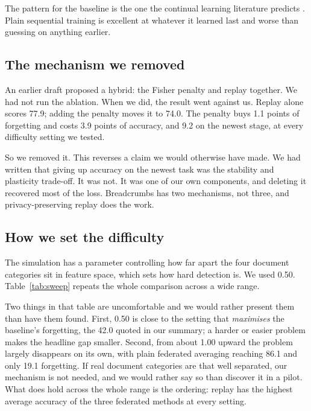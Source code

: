 \documentclass[11pt,a4paper]{article}
\begin{document}
The pattern for the baseline is the one the continual learning literature
predicts \citep{delange2022survey}. Plain sequential training is excellent at
whatever it learned last and worse than guessing on anything earlier.

\subsection{The mechanism we removed}
\label{sec:removed}

An earlier draft proposed a hybrid: the Fisher penalty and replay together. We
had not run the ablation. When we did, the result went against us. Replay alone
scores 77.9; adding the penalty moves it to 74.0. The penalty buys 1.1 points of
forgetting and costs 3.9 points of accuracy, and 9.2 on the newest stage, at
every difficulty setting we tested.

So we removed it. This reverses a claim we would otherwise have made. We had
written that giving up accuracy on the newest task was the stability and
plasticity trade-off. It was not. It was one of our own components, and deleting
it recovered most of the loss. Breadcrumbs has two mechanisms, not three, and
privacy-preserving replay does the work.

\subsection{How we set the difficulty}
\label{sec:difficulty}

The simulation has a parameter controlling how far apart the four document
categories sit in feature space, which sets how hard detection is. We used 0.50.
Table~\ref{tab:sweep} repeats the whole comparison across a wide range.

Two things in that table are uncomfortable and we would rather present them than
have them found. First, 0.50 is close to the setting that \emph{maximises} the
baseline's forgetting, the 42.0 quoted in our summary; a harder or easier
problem makes the headline gap smaller. Second, from about 1.00 upward the
problem largely disappears on its own, with plain federated averaging reaching
86.1 and only 19.1 forgetting. If real document categories are that well
separated, our mechanism is not needed, and we would rather say so than discover
it in a pilot. What does hold across the whole range is the ordering: replay has
the highest average accuracy of the three federated methods at every setting.
\end{document}
